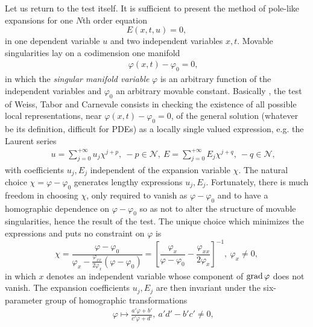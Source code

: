 \documentclass[10pt]{article}
\begin{document}
Let us return to the test itself.
It is sufficient to present the method of pole-like expansions 
for one $N$th order equation 
\begin{equation}
    E(x,t,u)=0,
\label{eqDEgeneral}
\end{equation}
in one dependent variable $u$
and two independent variables $x,t$.
Movable singularities lay on a codimension one manifold
\begin{eqnarray}
& &
\varphi(x,t) - \varphi_0=0,
\label{eqPDEManifold}
\end{eqnarray}
in which the \textit{singular manifold variable}
$\varphi$ is an arbitrary function of the independent variables
and $\varphi_0$ an arbitrary movable constant.
Basically \cite{WTC},
the test of Weiss, Tabor and Carnevale
consists in checking the existence of all possible
local representations, near $\varphi(x,t) - \varphi_0=0$,
of the general solution
(whatever be its definition, difficult for PDEs)
as a locally single valued expression, e.g. the Laurent series
\begin{eqnarray}
& &
u = \sum^{+\infty}_{j=0} u_j \chi^{j+p},\ -p \in {\mathcal N},\
E = \sum^{+\infty}_{j=0} E_j \chi^{j+q},\ -q \in {\mathcal N},
\label{eqLaurentSeries}
\end{eqnarray}
with coefficients $u_j,E_j$ independent of the expansion variable $\chi$.
The natural choice $\chi=\varphi - \varphi_0$ \cite{WTC}
generates lengthy expressions $u_j,E_j$.
Fortunately, there is much freedom in choosing $\chi$,
only required to vanish as $\varphi - \varphi_0$ and to have a homographic
dependence on $\varphi - \varphi_0$ so as not to alter the structure of
movable singularities, hence the result of the test.
The unique choice which minimizes the
expressions and puts no constraint on $\varphi$ is \cite{Conte1989}
\begin{equation}
 \chi
=\frac{\varphi-\varphi_0}{\varphi_x
- \displaystyle{\frac{\varphi_{xx}}{2 \varphi_x}}
(\varphi-\varphi_0)}
=\left[\frac{\varphi_x}{\varphi-\varphi_0}
- \frac{\varphi_{xx}}{2 \varphi_x}\right]^{-1},\
\varphi_x \not=0,
\label{eqchi}
\end{equation}
in which $x$ denotes an independent variable whose component of
$\mathop{\rm grad}\nolimits \varphi$ does not vanish.
The expansion coefficients $u_j,E_j$ are then invariant under the
six-parameter group of homographic transformations
\index{homographic!group}
\begin{eqnarray}
& &
\varphi \mapsto \frac{a' \varphi + b'}{c' \varphi + d'},\
a'd'-b'c' \not=0,
\end{eqnarray}
\end{document}
